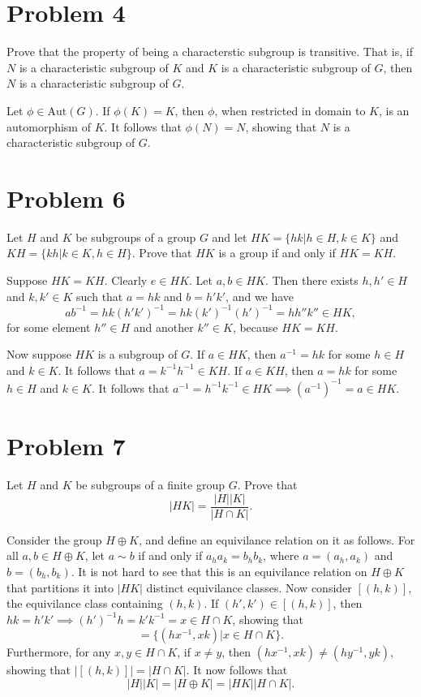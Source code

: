 \documentclass[12pt]{article}
\newcommand{\aut}{\mbox{Aut}}
\begin{document}
\section*{Problem 4}

Prove that the property of being a characterstic subgroup is transitive.
That is, if $N$ is a characteristic subgroup of $K$ and $K$ is a characteristic
subgroup of $G$, then $N$ is a characteristic subgroup of $G$.

Let $\phi\in\aut(G)$.  If $\phi(K)=K$, then $\phi$, when restricted in
domain to $K$, is an automorphism of $K$.  It follows that
$\phi(N)=N$, showing that $N$ is a characteristic subgroup of $G$.

\section*{Problem 6}

Let $H$ and $K$ be subgroups of a group $G$ and let $HK=\{hk|h\in H,k\in K\}$
and $KH=\{kh|k\in K,h\in H\}$.  Prove that $HK$ is a group if and only if
$HK=KH$.

Suppose $HK=KH$.  Clearly $e\in HK$.  Let $a,b\in HK$.
Then there exists $h,h'\in H$ and $k,k'\in K$ such that
$a=hk$ and $b=h'k'$, and we have
\begin{equation*}
ab^{-1}=hk(h'k')^{-1}=hk(k')^{-1}(h')^{-1} = hh''k''\in HK,
\end{equation*}
for some element $h''\in H$ and another $k''\in K$, because
$HK=KH$.

Now suppose $HK$ is a subgroup of $G$.  If $a\in HK$,
then $a^{-1}=hk$ for some $h\in H$ and $k\in K$.
It follows that $a=k^{-1}h^{-1}\in KH$.
If $a\in KH$, then $a=hk$ for some $h\in H$ and $k\in K$.
It follows that $a^{-1}=h^{-1}k^{-1}\in HK\implies (a^{-1})^{-1}=a\in HK$.

\section*{Problem 7}

Let $H$ and $K$ be subgroups of a finite group $G$.  Prove that
\begin{equation*}
|HK|=\frac{|H||K|}{|H\cap K|}.
\end{equation*}

Consider the group $H\oplus K$, and define an equivilance
relation on it as follows.  For all $a,b\in H\oplus K$,
let $a\sim b$ if and only if $a_ha_k=b_hb_k$,
where $a=(a_h,a_k)$ and $b=(b_h,b_k)$.  It is not
hard to see that this is an equivilance relation
on $H\oplus K$ that partitions it into $|HK|$
distinct equivilance classes.  Now consider
$[(h,k)]$, the equivilance class containing $(h,k)$.
If $(h',k')\in[(h,k)]$, then $hk=h'k'\implies (h')^{-1}h=k'k^{-1}=x\in H\cap K$,
showing that
\begin{equation*}
[(h,k)]=\{(hx^{-1},xk)|x\in H\cap K\}.
\end{equation*}
Furthermore, for any $x,y\in H\cap K$, if $x\neq y$, then
$(hx^{-1},xk)\neq (hy^{-1},yk)$, showing that
$|[(h,k)]|=|H\cap K|$.  It now follows that
\begin{equation*}
|H||K|=|H\oplus K|=|HK||H\cap K|.
\end{equation*}
\end{document}
